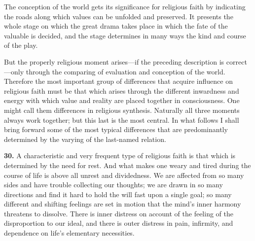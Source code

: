 \documentclass[12pt,a4paper]{book}
\newcommand{\opage}[1]{\marginnote{\footnotesize\textit{[#1]}}}
\begin{document}
The conception of the world gets its significance for religious faith by
indicating the roads along which values can be unfolded and preserved. It
presents the whole stage on which the great drama takes place in which the fate
of the valuable is decided, and the stage determines in many ways the kind and
course of the play.

But the properly religious moment arises---if the preceding description is
correct---only through the comparing of evaluation and conception of the world.
Therefore the most important group of differences that acquire influence on
religious faith must be that which arises through the different inwardness and
energy with which value and reality are placed together in consciousness. One
might call them differences in religious synthesis. Naturally all three moments
always work together; but this last is the most central. In what follows I shall
bring forward some of the most typical differences that are predominantly
determined by the varying of the last-named relation.

\medskip

\noindent\textbf{30.} A characteristic and very frequent type of religious faith
is that which is determined by the need for rest. And what makes one weary and
tired during the course of life is above all unrest and dividedness. We are
affected from so many sides and have trouble collecting our thoughts; we are
drawn in so many directions and find it hard 
\opage{73}to hold the will fast upon a single
goal; so many different and shifting feelings are set in motion that the mind's
inner harmony threatens to dissolve. There is inner distress on account of the
feeling of the disproportion to our ideal, and there is outer distress in pain,
infirmity, and dependence on life's elementary necessities.
\end{document}
